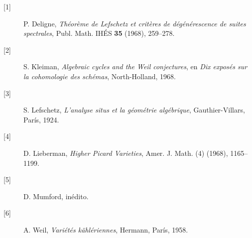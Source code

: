 \begin{description}
\item[{[1]}] P. Deligne, \emph{Théorème de Lefschetz et critères de
dégénérescence de suites spectrales}, Publ. Math. IHÉS \textbf{35}
(1968), 259--278.

\item[{[2]}] S. Kleiman, \emph{Algebraic cycles and the Weil
conjectures}, en \emph{Dix exposés sur la cohomologie des schémas},
North-Holland, 1968.

\item[{[3]}] S. Lefschetz, \emph{L'analyse situs et la géométrie
algébrique}, Gauthier-Villars, París, 1924.

\item[{[4]}] D. Lieberman, \emph{Higher Picard Varieties}, Amer. J.
Math. \textbf{} (4) (1968), 1165--1199.

\item[{[5]}] D. Mumford, inédito.

\item[{[6]}] A. Weil, \emph{Variétés kählériennes}, Hermann, París,
1958.
\end{description}
